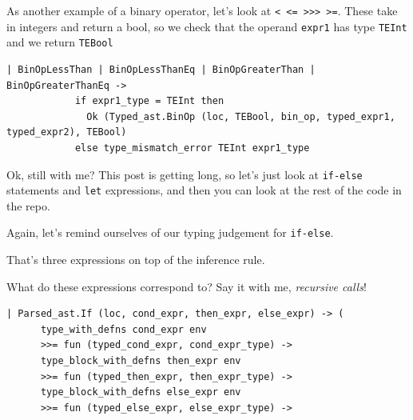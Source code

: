 {{As another example of a binary operator, let's look at
\texttt{\textless{}\ \textless{}=\ \textgreater{}\textgreater{}\textgreater{}\ \textgreater{}=}.
These take in integers and return a bool, so we check that the operand
\texttt{expr1} has type \texttt{TEInt} and we return \texttt{TEBool}

%

\begin{lstlisting}[language=caml]
| BinOpLessThan | BinOpLessThanEq | BinOpGreaterThan | BinOpGreaterThanEq ->
            if expr1_type = TEInt then
              Ok (Typed_ast.BinOp (loc, TEBool, bin_op, typed_expr1, typed_expr2), TEBool)
            else type_mismatch_error TEInt expr1_type
\end{lstlisting}

Ok, still with me? This post is getting long, so let's just look at
\texttt{if-else} statements and \texttt{let} expressions, and then you
can look at the rest of the code in the repo.

Again, let's remind ourselves of our typing judgement for
\texttt{if-else}.

{{}}

That's three expressions on top of the inference rule.

What do these expressions correspond to? Say it with me, \emph{recursive
calls}!

\begin{lstlisting}[language=caml]
| Parsed_ast.If (loc, cond_expr, then_expr, else_expr) -> (
      type_with_defns cond_expr env
      >>= fun (typed_cond_expr, cond_expr_type) ->
      type_block_with_defns then_expr env
      >>= fun (typed_then_expr, then_expr_type) ->
      type_block_with_defns else_expr env
      >>= fun (typed_else_expr, else_expr_type) ->
\end{lstlisting}

}}
